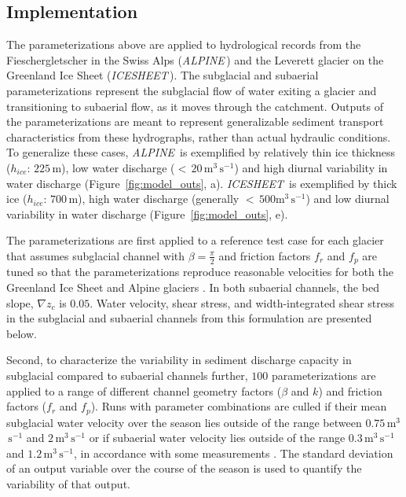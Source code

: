 \documentclass[11pt]{article}
\newcommand{\alpine}{\textit{ALPINE}\,}
\newcommand{\icesheet}{\textit{ICESHEET}\,}
\newcommand{\unit}[1]{$\mathrm{#1}$}
\begin{document}
\subsection{Implementation}
\label{sect:imp}

The parameterizations above are applied to hydrological records from the Fieschergletscher in the Swiss Alps (\alpine) and the Leverett glacier on the Greenland Ice Sheet (\icesheet).
The subglacial and subaerial parameterizations represent the subglacial flow of water exiting a glacier and transitioning to subaerial flow, as it moves through the catchment.
Outputs of the parameterizations are meant to represent generalizable sediment transport characteristics from these hydrographs, rather than actual hydraulic conditions.
To generalize these cases, \alpine{}  is exemplified by relatively thin ice thickness ($h_{ice}$: $225$\,\unit{m}), low water discharge ($<\,20$\,\unit{m}$^3$\,\unit{s}$^{-1}$) and high diurnal variability in water discharge (Figure~\ref{fig:model_outs}, a).
 \icesheet{}  is exemplified by thick ice  ($h_{ice}$: $700$\,\unit{m}), high water discharge (generally $<\,500$\unit{m}$^3$\,\unit{s}$^{-1}$)  and low diurnal variability in water discharge (Figure~\ref{fig:model_outs}, e).

The parameterizations are first applied to a reference test case for each glacier that assumes  subglacial channel with $\beta=\frac{\pi}{2}$ and friction factors $f_r$ and $f_p$ are tuned so that the parameterizations reproduce reasonable velocities for both  the Greenland Ice Sheet and Alpine glaciers \citep[$\sim\,1.6\,$\unit{m}$^3$\,\unit{s}$^{-1}$][]{werder2010b,chandler2013}.
In both subaerial channels, the bed slope, $\nabla z_c$ is $0.05$.
Water velocity, shear stress, and width-integrated shear stress in the subglacial and subaerial channels from this formulation are presented below.  

Second, to characterize the variability in sediment discharge capacity in subglacial compared to subaerial channels further, $100$  parameterizations are applied to a range of different channel geometry factors ($\beta$ and $k$) and friction factors ($f_r$ and $f_p$).
Runs with parameter combinations are culled if their mean subglacial water velocity over the season lies outside of the range between $0.75$\,\unit{m}$^3$\,\unit{s}$^{-1}$ and $2$\,\unit{m}$^3$\,\unit{s}$^{-1}$ or if subaerial water velocity lies outside of the range $0.3$\,\unit{m}$^3$\,\unit{s}$^{-1}$ and $1.2$\,\unit{m}$^3$\,\unit{s}$^{-1}$, in accordance with some measurements \citep[e.g.][]{werder2010b,magnusson2012,chandler2013}.
The standard deviation of an output variable over the course of the season is used to quantify the variability of that output.
\end{document}
